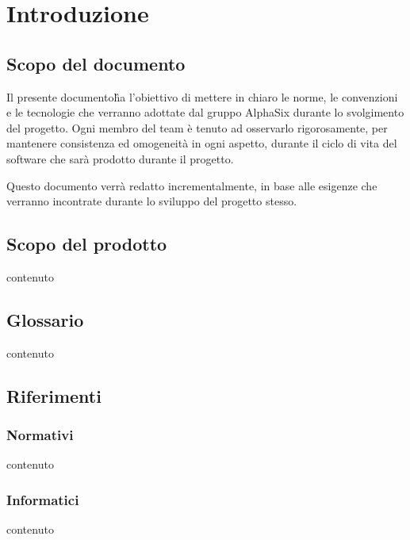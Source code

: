 \section{Introduzione}

\subsection{Scopo del documento}
    Il presente documento\G ha l’obiettivo di mettere in chiaro le norme, le convenzioni e le tecnologie
    che verranno adottate dal gruppo AlphaSix durante lo svolgimento del progetto\GAlt. Ogni membro del team
    \`e tenuto ad osservarlo rigorosamente, per mantenere consistenza ed omogeneit\`a in ogni aspetto, durante il ciclo di
    vita del software che sarà prodotto durante il progetto. \par
    Questo documento verr\`a redatto incrementalmente, in base alle esigenze che verranno incontrate durante lo sviluppo del
    progetto stesso.

\subsection{Scopo del prodotto}
    contenuto

\subsection{Glossario}
    contenuto

\subsection{Riferimenti}

    \subsubsection{Normativi}
        contenuto

    \subsubsection{Informatici}
        contenuto
